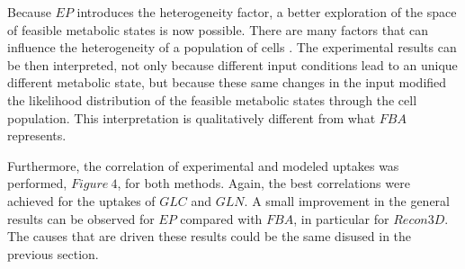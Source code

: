   	Because $EP$ introduces the heterogeneity factor, a better exploration of the space of feasible metabolic states is now possible. There are many factors that can influence the heterogeneity of a population of cells . The experimental results can be then interpreted, not only because different input conditions lead to an unique different metabolic state, but because these same changes in the input modified the likelihood distribution of the feasible metabolic states through the cell population. This interpretation is qualitatively different from what $FBA$ represents.
	
  	Furthermore, the correlation of experimental and modeled uptakes was performed, $Figure\ 4$, for both methods. Again, the best correlations were achieved for the uptakes of $GLC$ and $GLN$. A small improvement in the general results can be observed for $EP$ compared with $FBA$, in particular for $Recon3D$. The causes that are driven these results could be the same disused in the previous section. 